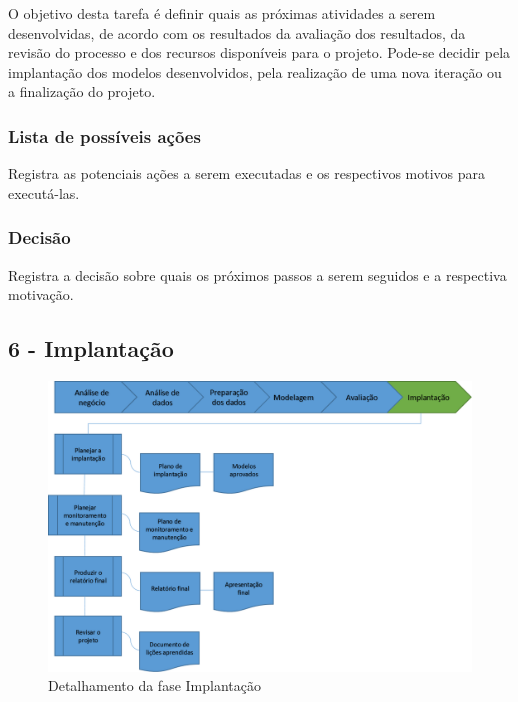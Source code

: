 O objetivo desta tarefa é definir quais as próximas atividades a serem desenvolvidas, de acordo com os resultados da avaliação dos resultados, da revisão do processo e dos recursos disponíveis para o projeto. Pode-se decidir pela implantação dos modelos desenvolvidos, pela realização de uma nova iteração ou a finalização do projeto.

\subsubsection*{Lista de possíveis ações}

Registra as potenciais ações a serem executadas e os respectivos motivos para executá-las.

\subsubsection*{Decisão}

Registra a decisão sobre quais os próximos passos a serem seguidos e a respectiva motivação.

\newpage 

\subsection*{6 - Implantação}


\begin{figure}[H]
	\includegraphics[scale=0.8]{img/CRISP-DM-Implantacao.png}
	\caption{Detalhamento da fase Implantação}
	\label{img:CRISP-DM-Implantação}
\end{figure}


